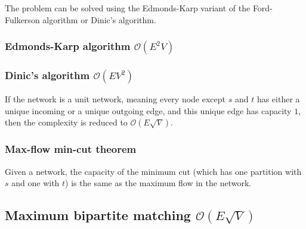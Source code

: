 The problem can be solved using the Edmonds-Karp variant of the Ford-Fulkerson algorithm or Dinic's algorithm.

\subsubsection{Edmonds-Karp algorithm $\mathcal O(E^2V)$}

\subsubsection{Dinic's algorithm $\mathcal O(EV^2)$}
If the network is a unit network, meaning every node except $s$ and $t$ has either a unique incoming or a unique outgoing edge, and this unique edge has capacity $1$, then the complexity is reduced to $\mathcal O(E\sqrt V)$.

\subsubsection{Max-flow min-cut theorem}
Given a network, the capacity of the minimum cut (which has one partition with $s$ and one with $t$) is the same as the maximum flow in the network.



\subsection{Maximum bipartite matching $\mathcal O(E\sqrt V)$}

